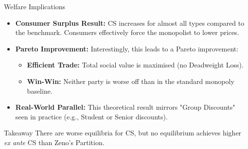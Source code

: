\documentclass{beamer}
\begin{document}
    \begin{frame}{Welfare Implications}
        \begin{itemize}
            \item \textbf{Consumer Surplus Result:} 
            CS increases for almost all types compared to the benchmark. Consumers effectively force the monopolist to lower prices.
            
            \item \textbf{Pareto Improvement:} 
            Interestingly, this leads to a Pareto improvement:
            \begin{itemize}
                \item \textbf{Efficient Trade:} Total social value is maximised (no Deadweight Loss).
                \item \textbf{Win-Win:} Neither party is worse off than in the standard monopoly baseline.
            \end{itemize}
            \item \textbf{Real-World Parallel:} This theoretical result mirrors "Group Discounts" seen in practice (e.g., Student or Senior discounts).
        \end{itemize}
        
        \vspace{0.2cm}
        
        \begin{block}{Takeaway}
            There are worse equilibria for CS, but no equilibrium achieves higher \textit{ex ante} CS than Zeno's Partition.
        \end{block}
    \end{frame}
    
\end{document}
